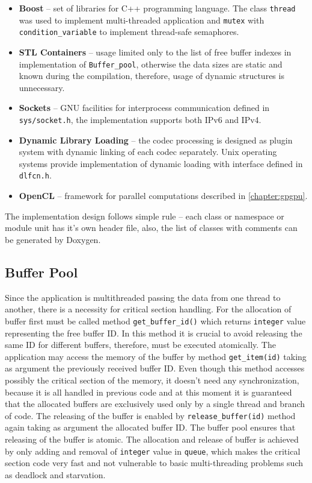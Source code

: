 \begin{itemize}
\item \textbf{Boost} -- set of libraries for C++ programming language. The 
class \texttt{thread} was used to implement multi-threaded application
and \texttt{mutex} with \texttt{condition\_variable} to implement
thread-safe semaphores.
\item \textbf{STL Containers} -- usage limited only to the list of free buffer
indexes in implementation of \texttt{Buffer\_pool}, otherwise the data sizes
are static and known during the compilation, therefore, usage of dynamic 
structures is unnecessary.
\item \textbf{Sockets} -- GNU facilities for interprocess communication defined
in \texttt{sys/socket.h}, the implementation supports both IPv6 and IPv4.
\item \textbf{Dynamic Library Loading} -- the codec processing is designed as 
plugin system with dynamic linking of each codec separately. Unix operating
systems provide implementation of dynamic loading with interface defined in 
\texttt{dlfcn.h}.
\item \textbf{OpenCL} -- framework for parallel computations described in 
\ref{chapter:gpgpu}.
\end{itemize}

The implementation design follows simple rule -- each class or namespace or 
module unit has it's own header file, also, the list of classes with 
comments can be generated by Doxygen.

\subsection{Buffer Pool}
Since the application is multithreaded passing the data from one thread to 
another, there is a necessity for critical section handling. For the allocation
of buffer first must be called method \texttt{get\_buffer\_id()} which returns
\texttt{integer} value representing the free buffer ID. In this method it is 
crucial to avoid releasing the same ID for different buffers, therefore, must
be executed atomically. The application may access the memory of the buffer
by method \texttt{get\_item(id)} taking as argument the previously received 
buffer ID. Even though this method accesses possibly the critical section of
the memory, it doesn't need any synchronization, because it is all handled in 
previous code and at this moment it is guaranteed that the allocated buffers
are exclusively used only by a single thread and branch of code. The releasing
of the buffer is enabled by \texttt{release\_buffer(id)} method again taking as
argument the allocated buffer ID. The buffer pool ensures that releasing of
the buffer is atomic. The allocation and release of buffer is achieved by
only adding and removal of \texttt{integer} value in \texttt{queue}, which
makes the critical section code very fast and not vulnerable to basic 
multi-threading problems such as deadlock and starvation.

